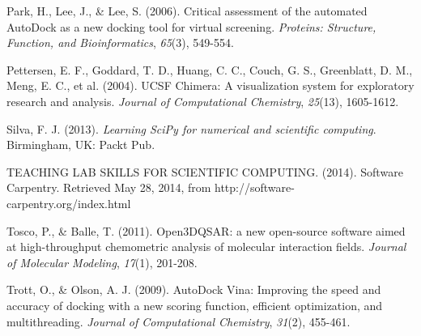 \documentclass[10pt,letterpaper]{article}
\begin{document}
\begin{thebibliography}{99}
 Park, H., Lee, J., \& Lee, S. (2006).
 Critical assessment of the automated AutoDock as a new docking tool for virtual screening.
 \textit{Proteins: Structure, Function, and Bioinformatics},
 \textit{65}(3),
 549-554.

 Pettersen, E. F., Goddard, T. D., Huang, C. C., Couch, G. S., Greenblatt, D. M., Meng, E. C., et al. (2004).
 UCSF Chimera: A visualization system for exploratory research and analysis.
 \textit{Journal of Computational Chemistry},
 \textit{25}(13),
 1605-1612.

 Silva, F. J. (2013).
 \textit{Learning SciPy for numerical and scientific computing}.
 Birmingham, UK:
 Packt Pub.

 TEACHING LAB SKILLS FOR SCIENTIFIC COMPUTING. (2014).
 Software Carpentry.
 Retrieved May 28, 2014, from {\footnotesize http://software-carpentry.org/index.html}

 Tosco, P., \& Balle, T. (2011).
 Open3DQSAR: a new open-source software aimed at high-throughput chemometric analysis of molecular interaction fields.
 \textit{Journal of Molecular Modeling},
 \textit{17}(1),
 201-208.

 Trott, O., \& Olson, A. J. (2009).
 AutoDock Vina: Improving the speed and accuracy of docking with a new scoring function, efficient optimization, and multithreading.
 \textit{Journal of Computational Chemistry},
 \textit{31}(2),
 455-461.

\end{thebibliography}
\end{document}
